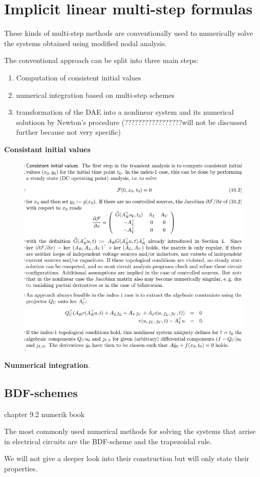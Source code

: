 \section{Implicit linear multi-step formulas}
These kinds of multi-step methods are conventionally used to numerically solve the systems obtained using modified nodal analysis. 

The conventional approach can be split into three main steps:
\begin{enumerate}
	\item Computation of consistent initial values
	\item numerical integration based on multi-step schemes
	\item transformation of the DAE into a nonlinear system and its numerical solutioon by Newton's procedure (?????????????????will not be discussed further because not very specific)
\end{enumerate}

\textbf{Consistant initial values} 
\begin{figure}[H]
	\centering
	\includegraphics[width=0.7\linewidth]{screenshot009}
	\caption{}
	\label{fig:screenshot009}
\end{figure}

\textbf{Nunmerical integration}.


\subsection{BDF-schemes}
	chapter 9.2 numerik book
	
	The most commonly used numerical methods for solving the systems that arrise in electrical circuits are the BDF-scheme and the trapezoidal rule. 
	
	We will not give a deeper look into their construction but will only state their properties.
	
